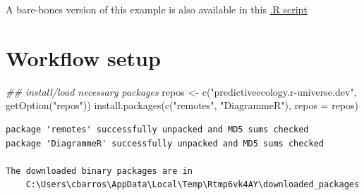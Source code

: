 \documentclass[
  letterpaper,
  DIV=11,
  numbers=noendperiod]{scrreprt}
\newenvironment{Shaded}{\begin{snugshade}}{\end{snugshade}}
\newcommand{\AttributeTok}[1]{\textcolor[rgb]{0.40,0.45,0.13}{#1}}
\newcommand{\DocumentationTok}[1]{\textcolor[rgb]{0.37,0.37,0.37}{\textit{#1}}}
\newcommand{\FunctionTok}[1]{\textcolor[rgb]{0.28,0.35,0.67}{#1}}
\newcommand{\NormalTok}[1]{\textcolor[rgb]{0.00,0.23,0.31}{#1}}
\newcommand{\OtherTok}[1]{\textcolor[rgb]{0.00,0.23,0.31}{#1}}
\newcommand{\StringTok}[1]{\textcolor[rgb]{0.13,0.47,0.30}{#1}}
\begin{document}
A bare-bones version of this example is also available in this
\href{https://github.com/PredictiveEcology/PredictiveEcology.org/blob/training-book/tutos/castorExample/castorExample.R}{.R
script}

\section{Workflow setup}\label{workflow-setup}

\begin{Shaded}
\begin{Highlighting}[]
\DocumentationTok{\#\# install/load necessary packages}
\NormalTok{repos }\OtherTok{\textless{}{-}} \FunctionTok{c}\NormalTok{(}\StringTok{"predictiveecology.r{-}universe.dev"}\NormalTok{, }\FunctionTok{getOption}\NormalTok{(}\StringTok{"repos"}\NormalTok{))}
\FunctionTok{install.packages}\NormalTok{(}\FunctionTok{c}\NormalTok{(}\StringTok{"remotes"}\NormalTok{, }\StringTok{"DiagrammeR"}\NormalTok{), }\AttributeTok{repos =}\NormalTok{ repos)}
\end{Highlighting}
\end{Shaded}

\begin{verbatim}
package 'remotes' successfully unpacked and MD5 sums checked
package 'DiagrammeR' successfully unpacked and MD5 sums checked

The downloaded binary packages are in
    C:\Users\cbarros\AppData\Local\Temp\Rtmp6vk4AY\downloaded_packages
\end{verbatim}
\end{document}
